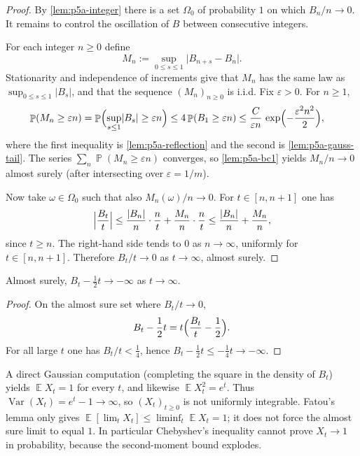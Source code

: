 \documentclass[11pt,a4paper]{article}
\DeclareMathOperator{\Var}{Var}
\DeclareMathOperator{\E}{\mathbb{E}}
\DeclareMathOperator{\Pbb}{\mathbb{P}}
\begin{document}
\begin{proof}
By \cref{lem:p5a-integer} there is a set \(\Omega_0\) of probability \(1\) on which \(B_n/n\to 0\). It remains to control the oscillation of \(B\) between consecutive integers.

For each integer \(n\ge 0\) define
\[
M_n
:=
\sup_{0\le s\le 1}\lvert B_{n+s}-B_n\rvert.
\]
Stationarity and independence of increments give that \(M_n\) has the same law as \(\sup_{0\le s\le 1}\lvert B_s\rvert\), and that the sequence \((M_n)_{n\ge 0}\) is i.i.d. Fix \(\varepsilon>0\). For \(n\ge 1\),
\begin{align*}
\Pbb(M_n\ge\varepsilon n)
&=
\Pbb\Bigl(\sup_{s\le 1}\lvert B_s\rvert\ge\varepsilon n\Bigr)
\le
4\Pbb(B_1\ge\varepsilon n)
\le
\frac{C}{\varepsilon n}\,\exp\Bigl(-\frac{\varepsilon^2 n^2}{2}\Bigr),
\end{align*}
where the first inequality is \cref{lem:p5a-reflection} and the second is \cref{lem:p5a-gauss-tail}. The series \(\sum_n\Pbb(M_n\ge\varepsilon n)\) converges, so \cref{lem:p5a-bc1} yields \(M_n/n\to 0\) almost surely (after intersecting over \(\varepsilon=1/m\)).

Now take \(\omega\in\Omega_0\) such that also \(M_n(\omega)/n\to 0\). For \(t\in[n,n+1]\) one has
\[
\Bigl\lvert\frac{B_t}{t}\Bigr\rvert
\le
\frac{\lvert B_n\rvert}{n}\cdot\frac{n}{t}
+
\frac{M_n}{n}\cdot\frac{n}{t}
\le
\frac{\lvert B_n\rvert}{n}
+
\frac{M_n}{n},
\]
since \(t\ge n\). The right-hand side tends to \(0\) as \(n\to\infty\), uniformly for \(t\in[n,n+1]\). Therefore \(B_t/t\to 0\) as \(t\to\infty\), almost surely.
\end{proof}

\begin{corollary}
\label{cor:p5a-drift}
Almost surely, \(B_t-\frac12 t\to-\infty\) as \(t\to\infty\).
\end{corollary}

\begin{proof}
On the almost sure set where \(B_t/t\to 0\),
\[
B_t-\frac12 t
=
t\Bigl(\frac{B_t}{t}-\frac12\Bigr).
\]
For all large \(t\) one has \(B_t/t<\frac14\), hence \(B_t-\frac12 t\le -\frac14 t\to-\infty\).
\end{proof}

\begin{remark*}[Why \(\E X_t=1\) does not contradict \(X_t\to 0\)]
A direct Gaussian computation (completing the square in the density of \(B_t\)) yields \(\E X_t=1\) for every \(t\), and likewise \(\E X_t^2=e^t\). Thus \(\Var(X_t)=e^t-1\to\infty\), so \((X_t)_{t\ge 0}\) is not uniformly integrable. Fatou's lemma only gives \(\E[\lim_t X_t]\le\liminf_t\E X_t=1\); it does not force the almost sure limit to equal \(1\). In particular Chebyshev's inequality cannot prove \(X_t\to 1\) in probability, because the second-moment bound explodes.
\end{remark*}
\end{document}

